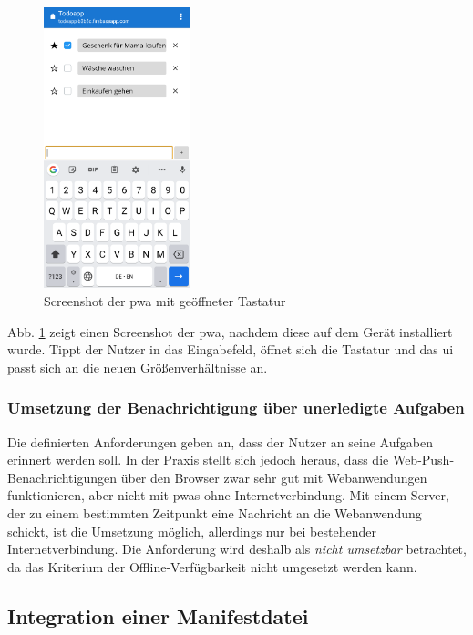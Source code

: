 \begin{figure}[h!]
	\centering
	\includegraphics[width=0.38\textwidth]{img/pwa_screenshot_mit_tastatur.png}
	\caption{Screenshot der \ac{pwa} mit geöffneter Tastatur}
	\label{fig:pwa_mit_tastatur}
\end{figure}

Abb. \ref{fig:pwa_mit_tastatur} zeigt einen Screenshot der \ac{pwa}, nachdem diese auf dem Gerät installiert wurde. Tippt der Nutzer in das Eingabefeld, öffnet sich die Tastatur und das \ac{ui} passt sich an die neuen Größenverhältnisse an.

\subsubsection{Umsetzung der Benachrichtigung über unerledigte Aufgaben}
Die definierten Anforderungen geben an, dass der Nutzer an seine Aufgaben erinnert werden soll. In der Praxis stellt sich jedoch heraus, dass die Web-Push-Benachrichtigungen über den Browser zwar sehr gut mit Webanwendungen funktionieren, aber nicht mit \ac{pwa}s ohne Internetverbindung. Mit einem Server, der zu einem bestimmten Zeitpunkt eine Nachricht an die Webanwendung schickt, ist die Umsetzung möglich, allerdings nur bei bestehender Internetverbindung. Die Anforderung wird deshalb als \textit{nicht umsetzbar} betrachtet, da das Kriterium der Offline-Verfügbarkeit nicht umgesetzt werden kann.


\subsection{Integration einer Manifestdatei}

